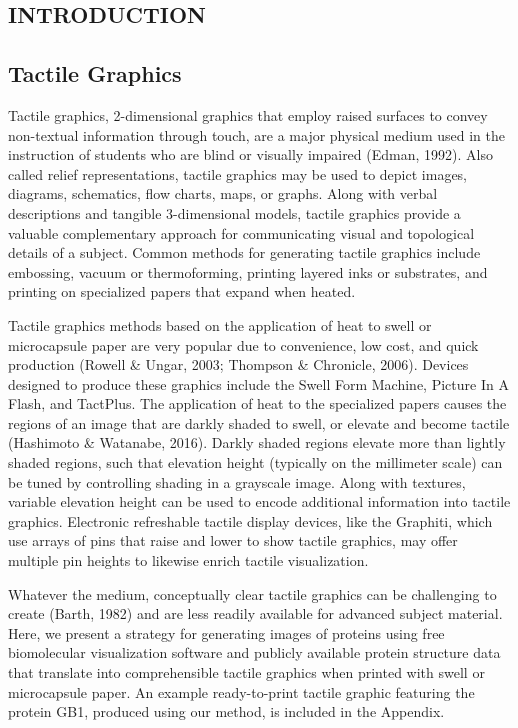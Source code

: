 \documentclass[11.5pt]{sig-alternate} %
\begin{document}
\begin{large}
 
\section*{INTRODUCTION}

\subsection*{Tactile Graphics}

Tactile graphics, 2-dimensional graphics that employ raised surfaces to convey non-textual information through touch, are a major physical medium used in the instruction of students who are blind or visually impaired (Edman, 1992). Also called relief representations, tactile graphics may be used to depict images, diagrams, schematics, flow charts, maps, or graphs. Along with verbal descriptions and tangible 3-dimensional models, tactile graphics provide a valuable complementary approach for communicating visual and topological details of a subject. Common methods for generating tactile graphics include embossing, vacuum or thermoforming, printing layered inks or substrates, and printing on specialized papers that expand when heated.

Tactile graphics methods based on the application of heat to swell or microcapsule paper are very popular due to convenience, low cost, and quick production (Rowell \& Ungar, 2003; Thompson \& Chronicle, 2006). Devices designed to produce these graphics include the Swell Form Machine, Picture In A Flash, and TactPlus. The application of heat to the specialized papers causes the regions of an image that are darkly shaded to swell, or elevate and become tactile (Hashimoto \& Watanabe, 2016). Darkly shaded regions elevate more than lightly shaded regions, such that elevation height (typically on the millimeter scale) can be tuned by controlling shading in a grayscale image. Along with textures, variable elevation height can be used to encode additional information into tactile graphics. Electronic refreshable tactile display devices, like the Graphiti, which use arrays of pins that raise and lower to show tactile graphics, may offer multiple pin heights to likewise enrich tactile visualization. 

Whatever the medium, conceptually clear tactile graphics can be challenging to create (Barth, 1982) and are less readily available for advanced subject material. Here, we present a strategy for generating images of proteins using free biomolecular visualization software and publicly available protein structure data that translate into comprehensible tactile graphics when printed with swell or microcapsule paper. An example ready-to-print tactile graphic featuring the protein GB1, produced using our method, is included in the Appendix.


\end{large}
\end{document}

